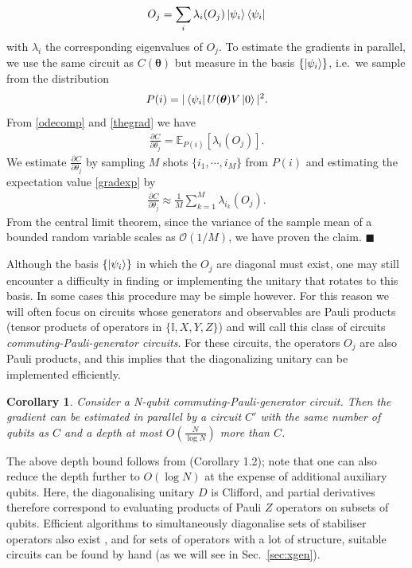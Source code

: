 \documentclass[twocolumn]{revtex4-2}
\newtheorem{corollary}{Corollary}
\renewcommand{\vec}{\boldsymbol}
\begin{document}
%
\begin{align}\label{odecomp}
    O_j = \sum_{i} \lambda_i(O_j)\ket{\psi_i}\bra{\psi_i}
\end{align}
%
with $\lambda_i$ the corresponding eigenvalues of $O_j$. To estimate the gradients in parallel, we use the same circuit as $C(\vec{\theta})$ but measure in the basis $\{\ket{\psi_i}\}$, i.e.\ we sample from the distribution 
%
\begin{align}
    P(i) = \vert\bra{\psi_i}U(\vec{\theta})V\ket{0}\vert^2.
\end{align}
%
From \eqref{odecomp} and \eqref{thegrad} we have 
%
\begin{align}\label{gradexp}
    \frac{\partial C}{\partial \theta_j} = \mathbb{E}_{P(i)}[\lambda_i(O_j)].
\end{align}
We estimate $\frac{\partial C}{\partial \theta_j}$ by sampling $M$ shots $\{i_1,\cdots,i_M\}$ from $P(i)$ and estimating the expectation value \eqref{gradexp} by
%
\begin{align}\label{postprocess}
    \frac{\partial C}{\partial \theta_j} \approx \frac{1}{M}\sum_{k=1}^M \lambda_{i_k}(O_j). 
\end{align}
%
From the central limit theorem, since the variance of the sample mean of a bounded random variable scales as $\mathcal{O}(1/M)$, we have proven the claim. $\blacksquare$


Although the basis $\{\ket{\psi_i}\}$ in which the $O_j$ are diagonal must exist, one may still encounter a difficulty in finding or implementing the unitary that rotates to this basis. In some cases this procedure may be simple however. For this reason we will often focus on circuits whose generators and observables are Pauli products (tensor products of operators in $\{\mathbb{I},X,Y,Z\}
$) and will call this class of circuits \emph{commuting-Pauli-generator circuits}. For these circuits, the operators $O_j$ are also Pauli products, and this implies that the diagonalizing unitary can be implemented efficiently.
%
\begin{corollary}
Consider a N-qubit commuting-Pauli-generator circuit. Then the gradient can be estimated in parallel by a circuit ${C}'$ with the same number of qubits as ${C}$ and a depth at most $O\left(\frac{N}{\log N}\right)$ more than ${C}$.
\end{corollary}
%
The above depth bound follows from \cite{jiang2020optimal} (Corollary 1.2); note that one can also reduce the depth further to $O(\log N)$ at the expense of additional auxiliary qubits. Here, the diagonalising unitary $D$ is Clifford, and partial derivatives therefore correspond to evaluating products of Pauli $Z$ operators on subsets of qubits. Efficient algorithms to simultaneously diagonalise sets of stabiliser operators also exist \cite{crawford2021efficient,yen2020measuring,gokhale2019minimizing}, and for sets of operators with a lot of structure, suitable circuits can be found by hand (as we will see in Sec.\ \ref{sec:xgen}). 
\end{document}
